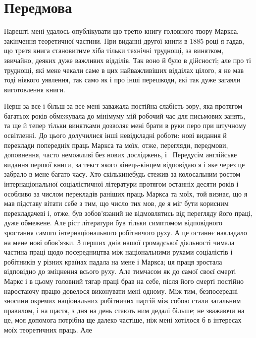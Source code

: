 
\section*{Передмова}

Нарешті мені удалось опублікувати цю третю книгу головного
твору Маркса, закінчення теоретичної частини. При виданні
другої книги в 1885 році я гадав, що третя книга становитиме
хіба тільки технічні труднощі, за винятком, звичайно, деяких
дуже важливих відділів. Так воно й було в дійсності; але про ті
труднощі, які мене чекали саме в цих найважливіших відділах
цілого, я не мав тоді ніякого уявлення, так само як і про інші
перешкоди, які так дуже загаяли виготовлення книги.

Перш за все і більш за все мені заважала постійна слабість
зору, яка протягом багатьох років обмежувала до мінімуму мій
робочий час для письмових занять, та ще й тепер тільки винятками
дозволяє мені брати в руки перо при штучному освітленні.
До цього долучилися інші невідкладні роботи: нові видання й
переклади попередніх праць Маркса та моїх, отже, перегляди,
передмови, доповнення, часто неможливі без нових досліджень,
і~ Передусім англійське видання першої книги, за текст
якого кінець-кінцем відповідаю я і яке через це забрало в мене
багато часу. Хто скількинебудь стежив за колосальним ростом
інтернаціональної соціалістичної літератури протягом останніх
десяти років і особливо за числом перекладів раніших праць
Маркса та моїх, той визнає, що я мав підставу вітати себе
з тим, що число тих мов, де я міг бути корисним перекладачеві
і, отже, був зобов’язаний не відмовлятись від перегляду його
праці, дуже обмежене. Але ріст літератури був тільки симптомом
відповідного зростання самого інтернаціонального робітничого
руху. А це останнє накладало на мене нові обов’язки.
З перших днів нашої громадської діяльності чимала частина праці
щодо посередництва між національними рухами соціалістів і робітників
у різних країнах падала на мене і Маркса; ця праця зростала
відповідно до зміцнення всього руху. Але тимчасом як
до самої своєї смерті Маркс і в цьому головний тягар праці
брав на себе, після його смерті постійно наростаючу працю довелося
виконувати мені одному. Між тим, безпосередні зносини
окремих національних робітничих партій між собою стали загальним
правилом, і на щастя, з дня на день стають ним дедалі більше;
не зважаючи на це, моя допомога потрібна ще далеко частіше,
ніж мені хотілося б в інтересах моїх теоретичних праць. Але
\parbreak{}  %
